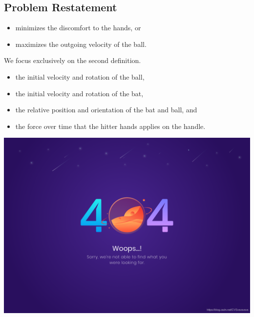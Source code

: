 \documentclass[12pt]{mcmthesis}
\begin{document}
\subsection{Problem Restatement}
\begin{itemize}
  \item minimizes the discomfort to the hands, or
  \item maximizes the outgoing velocity of the ball.
\end{itemize}
We focus exclusively on the second definition.
\begin{itemize}
  \item the initial velocity and rotation of the ball,
  \item the initial velocity and rotation of the bat,
  \item the relative position and orientation of the bat and ball, and
  \item the force over time that the hitter hands applies on the handle.
\end{itemize}



\includegraphics[scale=0.2]{404.png}  %

\end{document}
